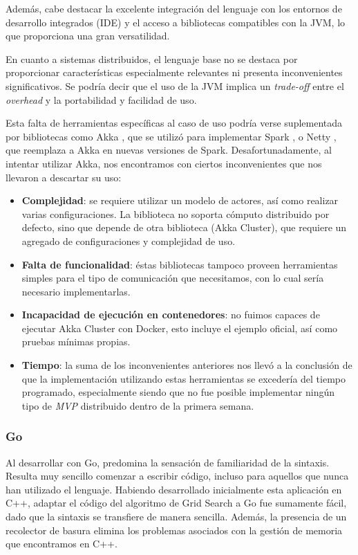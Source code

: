 \documentclass[11pt]{article}
\let\Oldsubsubsection\subsubsection
\renewcommand{\subsubsection}{\FloatBarrier\Oldsubsubsection}
\newcommand{\english}[1]{\textit{#1}}
\begin{document}
Además, cabe destacar la excelente integración del lenguaje con los entornos de desarrollo integrados (IDE) y el acceso a bibliotecas compatibles con la JVM, lo que proporciona una gran versatilidad.

En cuanto a sistemas distribuidos, el lenguaje base no se destaca por proporcionar características especialmente relevantes ni presenta inconvenientes significativos. Se podría decir que el uso de la JVM implica un \textit{trade-off} entre el \textit{overhead} y la portabilidad y facilidad de uso.

Esta falta de herramientas específicas al caso de uso podría verse suplementada por bibliotecas como Akka \cite{scala:lib:akka}, que se utilizó para implementar Spark \cite{scala:ex:spark}, o Netty \cite{scala:lib:netty}, que reemplaza a Akka en nuevas versiones de Spark. Desafortunadamente, al intentar utilizar Akka, nos encontramos con ciertos inconvenientes que nos llevaron a descartar su uso:
\begin{itemize}
    \item \textbf{Complejidad}: se requiere utilizar un modelo de actores, así como realizar varias configuraciones. La biblioteca no soporta cómputo distribuido por defecto, sino que depende de otra biblioteca (Akka Cluster), que requiere un agregado de configuraciones y complejidad de uso.
    \item \textbf{Falta de funcionalidad}: éstas bibliotecas tampoco proveen herramientas simples para el tipo de comunicación que necesitamos, con lo cual sería necesario implementarlas.
    \item \textbf{Incapacidad de ejecución en contenedores}: no fuimos capaces de ejecutar Akka Cluster con Docker, esto incluye el ejemplo oficial, así como pruebas mínimas propias.
    \item \textbf{Tiempo}: la suma de los inconvenientes anteriores nos llevó a la conclusión de que la implementación utilizando estas herramientas se excedería del tiempo programado, especialmente siendo que no fue posible implementar ningún tipo de \english{MVP} distribuido dentro de la primera semana.
\end{itemize}

\subsubsection{Go}

Al desarrollar con Go, predomina la sensación de familiaridad de la sintaxis. Resulta muy sencillo comenzar a escribir código, incluso para aquellos que nunca han utilizado el lenguaje. Habiendo desarrollado inicialmente esta aplicación en C++, adaptar el código del algoritmo de Grid Search a Go fue sumamente fácil, dado que la sintaxis se transfiere de manera sencilla. Además, la presencia de un recolector de basura elimina los problemas asociados con la gestión de memoria que encontramos en C++.
\end{document}
